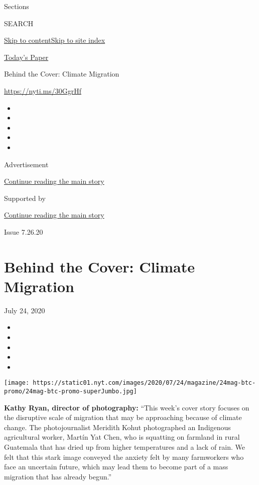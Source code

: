 Sections

SEARCH

\protect\hyperlink{site-content}{Skip to
content}\protect\hyperlink{site-index}{Skip to site index}

\href{https://myaccount.nytimes.com/auth/login?response_type=cookie\&client_id=vi}{}

\href{https://www.nytimes.com/section/todayspaper}{Today's Paper}

Behind the Cover: Climate Migration

\url{https://nyti.ms/30GgrHf}

\begin{itemize}
\item
\item
\item
\item
\item
\end{itemize}

Advertisement

\protect\hyperlink{after-top}{Continue reading the main story}

Supported by

\protect\hyperlink{after-sponsor}{Continue reading the main story}

Issue 7.26.20

\hypertarget{behind-the-cover-climate-migration}{%
\section{Behind the Cover: Climate
Migration}\label{behind-the-cover-climate-migration}}

July 24, 2020

\begin{itemize}
\item
\item
\item
\item
\item
\end{itemize}

\texttt{[image: https://static01.nyt.com/images/2020/07/24/magazine/24mag-btc-promo/24mag-btc-promo-superJumbo.jpg]}

\textbf{Kathy Ryan, director of photography:} ``This week's cover story
focuses on the disruptive scale of migration that may be approaching
because of climate change. The photojournalist Meridith Kohut
photographed an Indigenous agricultural worker, Martín Yat Chen, who is
squatting on farmland in rural Guatemala that has dried up from higher
temperatures and a lack of rain. We felt that this stark image conveyed
the anxiety felt by many farmworkers who face an uncertain future, which
may lead them to become part of a mass migration that has already
begun.''

